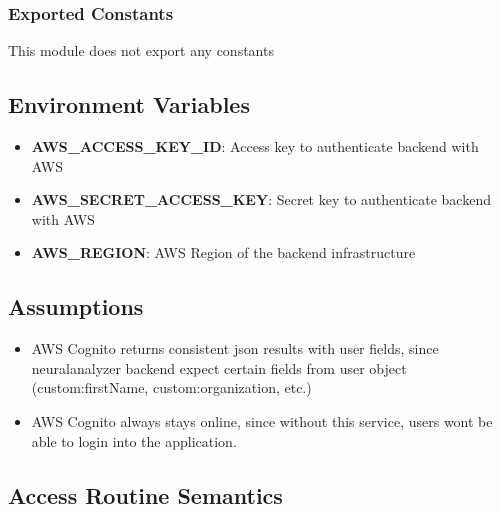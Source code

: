 \documentclass[12pt, titlepage]{article}
\begin{document}
\subsubsection{Exported Constants}
This module does not export any constants

\subsection{Environment Variables}
\begin{itemize}
    \item \textbf{AWS\_ACCESS\_KEY\_ID}: Access key to authenticate backend with AWS
    \item \textbf{AWS\_SECRET\_ACCESS\_KEY}: Secret key to authenticate backend with AWS
    \item \textbf{AWS\_REGION}: AWS Region of the backend infrastructure
\end{itemize}

\subsection{Assumptions}
\begin{itemize}
    \item AWS Cognito returns consistent json results with user fields, since neuralanalyzer backend expect certain fields from user object (custom:firstName, custom:organization, etc.)
    \item AWS Cognito always stays online, since without this service, users wont be able to login into the application.
\end{itemize}

\subsection{Access Routine Semantics}
\end{document}
